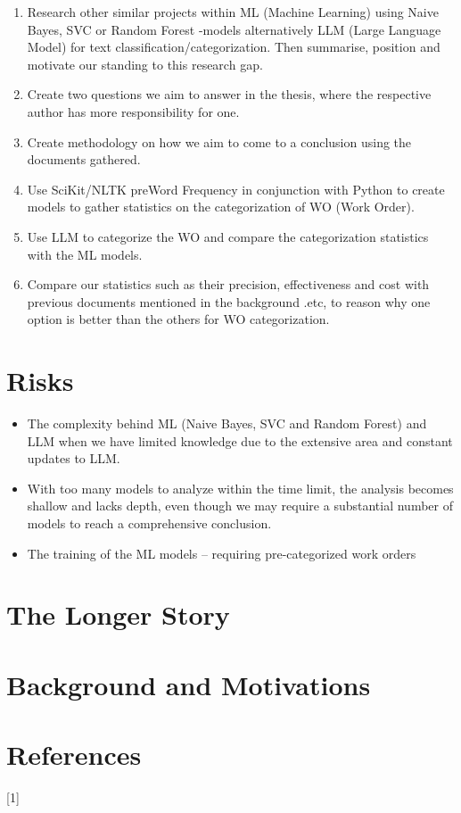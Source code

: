 \documentclass{article}
\begin{document}
\begin{enumerate}
\item Research other similar projects within ML (Machine Learning) using Naive Bayes, SVC or Random Forest -models alternatively LLM (Large Language Model) for text classification/categorization. Then summarise, position and motivate our standing to this research gap.
\item Create two questions we aim to answer in the thesis, where the respective author has more responsibility for one.
\item Create methodology on how we aim to come to a conclusion using the documents gathered.
\item Use SciKit/NLTK preWord Frequency in conjunction with Python to create models to gather statistics on the categorization of WO (Work Order).
\item Use LLM to categorize the WO and compare the categorization statistics with the ML models.
\item Compare our statistics such as their precision, effectiveness and cost with previous documents mentioned in the background .etc, to reason why one option is better than the others for WO categorization.
\end{enumerate}

\section{Risks}

\begin{itemize}
\item The complexity behind ML (Naive Bayes, SVC and Random Forest) and LLM when we have limited knowledge due to the extensive area and constant updates to LLM.
\item With too many models to analyze within the time limit, the analysis becomes shallow and lacks depth, even though we may require a substantial number of models to reach a comprehensive conclusion.
\item The training of the ML models – requiring pre-categorized work orders
\end{itemize}

\section{The Longer Story}

\section{Background and Motivations}

\section{References}

[1]
\end{document}
